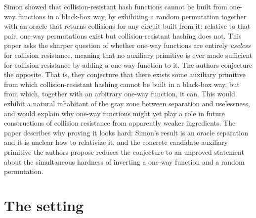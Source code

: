 \documentclass{aicr-conjecture}
\begin{document}

\vspace{0.4em}

\begin{informalconjecture}
Simon showed that collision-resistant hash functions cannot be built from
one-way functions in a black-box way, by exhibiting a random permutation
together with an oracle that returns collisions for any circuit built
from it: relative to that pair, one-way permutations exist but
collision-resistant hashing does not. This paper asks the sharper
question of whether one-way functions are entirely \emph{useless} for
collision resistance, meaning that no auxiliary primitive is ever made
sufficient for collision resistance by adding a one-way function to it.
The authors conjecture the opposite. That is, they conjecture that there
exists some auxiliary primitive from which collision-resistant hashing
cannot be built in a black-box way, but from which, together with an
arbitrary one-way function, it can. This would exhibit a natural
inhabitant of the gray zone between separation and uselessness, and would
explain why one-way functions might yet play a role in future
constructions of collision resistance from apparently weaker ingredients.
The paper describes why proving it looks hard: Simon's result is an
oracle separation and it is unclear how to relativize it, and the
concrete candidate auxiliary primitive the authors propose reduces the
conjecture to an unproved statement about the simultaneous hardness of
inverting a one-way function and a random permutation.
\end{informalconjecture}

\section{The setting}\label{sec:setting}
\end{document}
